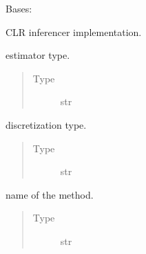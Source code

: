 \documentclass[letterpaper,10pt,english]{sphinxmanual}
\begin{document}
\begin{fulllineitems}
\label{\detokenize{_modules/cosifer.inferencers:cosifer.inferencers.clr.CLR}}
Bases: {\hyperref[\detokenize{_modules/cosifer.inferencers:cosifer.inferencers.network_inferencer.NetworkInferencer}]{}}

CLR inferencer implementation.

\begin{fulllineitems}
\label{\detokenize{_modules/cosifer.inferencers:cosifer.inferencers.clr.CLR.estimator}}
estimator type.
\begin{quote}\begin{description}
\item[{Type}] \leavevmode
str

\end{description}\end{quote}

\end{fulllineitems}


\begin{fulllineitems}
\label{\detokenize{_modules/cosifer.inferencers:cosifer.inferencers.clr.CLR.disc}}
discretization type.
\begin{quote}\begin{description}
\item[{Type}] \leavevmode
str

\end{description}\end{quote}

\end{fulllineitems}


\begin{fulllineitems}
\label{\detokenize{_modules/cosifer.inferencers:cosifer.inferencers.clr.CLR.method}}
name of the method.
\begin{quote}\begin{description}
\item[{Type}] \leavevmode
str

\end{description}\end{quote}

\end{fulllineitems}


\end{fulllineitems}
\end{document}
